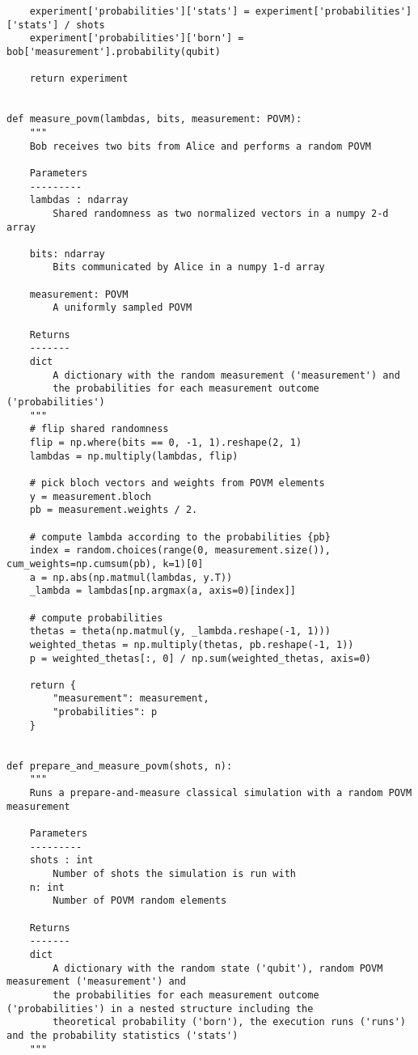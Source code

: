 \begin{verbatim}
    experiment['probabilities']['stats'] = experiment['probabilities']['stats'] / shots
    experiment['probabilities']['born'] = bob['measurement'].probability(qubit)

    return experiment


def measure_povm(lambdas, bits, measurement: POVM):
    """
    Bob receives two bits from Alice and performs a random POVM

    Parameters
    ---------
    lambdas : ndarray
        Shared randomness as two normalized vectors in a numpy 2-d array

    bits: ndarray
        Bits communicated by Alice in a numpy 1-d array

    measurement: POVM
        A uniformly sampled POVM

    Returns
    -------
    dict
        A dictionary with the random measurement ('measurement') and
        the probabilities for each measurement outcome ('probabilities')
    """
    # flip shared randomness
    flip = np.where(bits == 0, -1, 1).reshape(2, 1)
    lambdas = np.multiply(lambdas, flip)

    # pick bloch vectors and weights from POVM elements
    y = measurement.bloch
    pb = measurement.weights / 2.

    # compute lambda according to the probabilities {pb}
    index = random.choices(range(0, measurement.size()), cum_weights=np.cumsum(pb), k=1)[0]
    a = np.abs(np.matmul(lambdas, y.T))
    _lambda = lambdas[np.argmax(a, axis=0)[index]]

    # compute probabilities
    thetas = theta(np.matmul(y, _lambda.reshape(-1, 1)))
    weighted_thetas = np.multiply(thetas, pb.reshape(-1, 1))
    p = weighted_thetas[:, 0] / np.sum(weighted_thetas, axis=0)

    return {
        "measurement": measurement,
        "probabilities": p
    }


def prepare_and_measure_povm(shots, n):
    """
    Runs a prepare-and-measure classical simulation with a random POVM measurement

    Parameters
    ---------
    shots : int
        Number of shots the simulation is run with
    n: int
        Number of POVM random elements

    Returns
    -------
    dict
        A dictionary with the random state ('qubit'), random POVM measurement ('measurement') and
        the probabilities for each measurement outcome ('probabilities') in a nested structure including the
        theoretical probability ('born'), the execution runs ('runs') and the probability statistics ('stats')
    """


\end{verbatim}

